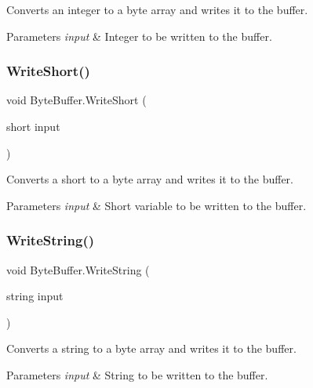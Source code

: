 Converts an integer to a byte array and writes it to the buffer. 


\begin{DoxyParams}{Parameters}
{\em input} & Integer to be written to the buffer.\\
\hline
\end{DoxyParams}
\mbox{\label{class_byte_buffer_a1b3f0df4368105492833d48b8c35b7e6}} 
\subsubsection{\texorpdfstring{WriteShort()}{WriteShort()}}
{\footnotesize\ttfamily void Byte\+Buffer.\+Write\+Short (\begin{DoxyParamCaption}\item[{short}]{input }\end{DoxyParamCaption})}



Converts a short to a byte array and writes it to the buffer. 


\begin{DoxyParams}{Parameters}
{\em input} & Short variable to be written to the buffer.\\
\hline
\end{DoxyParams}
\mbox{\label{class_byte_buffer_a0f46a523deadb0d47ad0bd5bd9ab58ba}} 
\subsubsection{\texorpdfstring{WriteString()}{WriteString()}}
{\footnotesize\ttfamily void Byte\+Buffer.\+Write\+String (\begin{DoxyParamCaption}\item[{string}]{input }\end{DoxyParamCaption})}



Converts a string to a byte array and writes it to the buffer. 


\begin{DoxyParams}{Parameters}
{\em input} & String to be written to the buffer.\\
\hline
\end{DoxyParams}


